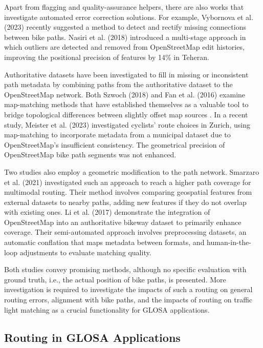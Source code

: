 Apart from flagging and quality-assurance helpers, there are also works that investigate automated error correction solutions. For example, Vybornova et al. (2023) \cite{vybornova_automated_2023} recently suggested a method to detect and rectify missing connections between bike paths. Nasiri et al. (2018) \cite{nasiri_improving_2018} introduced a multi-stage approach in which outliers are detected and removed from OpenStreetMap edit histories, improving the positional precision of features by 14\% in Teheran.  

Authoritative datasets have been investigated to fill in missing or inconsistent path metadata by combining paths from the authoritative dataset to the OpenStreetMap network. Both Szwoch (2018) \cite{szwoch_combining_2019} and Fan et al. (2016) \cite{fan_polygon-based_2016} examine map-matching methods that have established themselves as a valuable tool to bridge topological differences between slightly offset map sources \cite{chao_survey_2020}. In a recent study, Meister et al. (2023) \cite{meister_route_2023} investigated cyclists' route choices in Zurich, using map-matching to incorporate metadata from a municipal dataset due to OpenStreetMap's insufficient consistency. The geometrical precision of OpenStreetMap bike path segments was not enhanced.

Two studies also employ a geometric modification to the path network. Smarzaro et al. (2021) \cite{smarzaro_creation_2021} investigated such an approach to reach a higher path coverage for multimodal routing. Their method involves comparing geospatial features from external datasets to nearby paths, adding new features if they do not overlap with existing ones. Li et al. (2017) \cite{li_optimized_2017} demonstrate the integration of OpenStreetMap into an authoritative bikeway dataset to primarily enhance coverage. Their semi-automated approach involves preprocessing datasets, an automatic conflation that maps metadata between formats, and human-in-the-loop adjustments to evaluate matching quality. 

Both studies convey promising methods, although no specific evaluation with ground truth, i.e., the actual position of bike paths, is presented. More investigation is required to investigate the impacts of such a routing on general routing errors, alignment with bike paths, and the impacts of routing on traffic light matching as a crucial functionality for GLOSA applications.

\subsection{Routing in GLOSA Applications}

